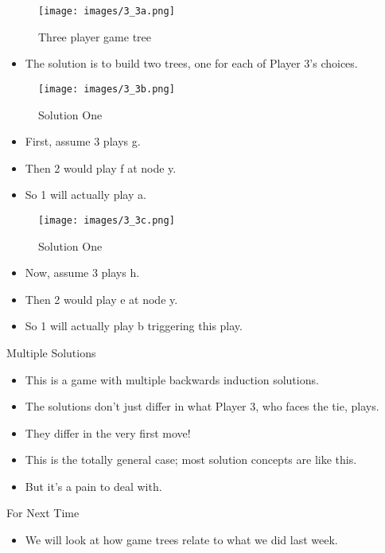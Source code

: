 \documentclass[
  ignorenonframetext,
]{beamer}
\providecommand{\tightlist}{%
  \setlength{\itemsep}{0pt}\setlength{\parskip}{0pt}}
\begin{document}
\begin{frame}
\begin{figure}
\centering
\texttt{[image: images/3\_3a.png]}
\caption{Three player game tree}
\end{figure}

\begin{itemize}
\tightlist
\item
  The solution is to build two trees, one for each of Player 3's
  choices.
\end{itemize}
\end{frame}

\begin{frame}
\begin{figure}
\centering
\texttt{[image: images/3\_3b.png]}
\caption{Solution One}
\end{figure}

\begin{itemize}
\tightlist
\item
  First, assume 3 plays g.
\item
  Then 2 would play f at node y.
\item
  So 1 will actually play a.
\end{itemize}
\end{frame}

\begin{frame}
\begin{figure}
\centering
\texttt{[image: images/3\_3c.png]}
\caption{Solution One}
\end{figure}

\begin{itemize}
\tightlist
\item
  Now, assume 3 plays h.
\item
  Then 2 would play e at node y.
\item
  So 1 will actually play b triggering this play.
\end{itemize}
\end{frame}

\begin{frame}{Multiple Solutions}
\protect\hypertarget{multiple-solutions}{}
\begin{itemize}
\tightlist
\item
  This is a game with multiple backwards induction solutions.
\item
  The solutions don't just differ in what Player 3, who faces the tie,
  plays.
\item
  They differ in the very first move!
\item
  This is the totally general case; most solution concepts are like
  this.
\item
  But it's a pain to deal with.
\end{itemize}
\end{frame}

\begin{frame}{For Next Time}
\protect\hypertarget{for-next-time}{}
\begin{itemize}
\tightlist
\item
  We will look at how game trees relate to what we did last week.
\end{itemize}
\end{frame}
\end{document}

